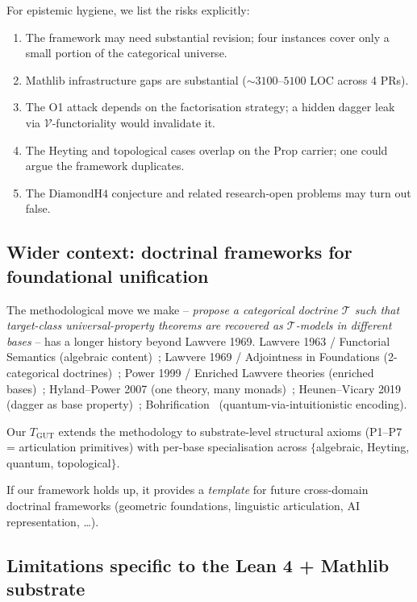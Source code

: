 \documentclass[11pt,a4paper]{article}
\theoremstyle{plain}
\theoremstyle{definition}
\theoremstyle{remark}
\newcommand{\TGUT}{T_{\mathrm{GUT}}}
\newcommand{\DiamondH}{\mathrm{DiamondH4}}
\begin{document}
For epistemic hygiene, we list the risks explicitly:
\begin{enumerate}[leftmargin=*]
\item The framework may need substantial revision; four instances cover only a small portion of the categorical universe.
\item Mathlib infrastructure gaps are substantial (${\sim}3100$--$5100$ LOC across 4 PRs).
\item The O1 attack depends on the factorisation strategy; a hidden dagger leak via $\mathcal{V}$-functoriality would invalidate it.
\item The Heyting and topological cases overlap on the $\mathrm{Prop}$ carrier; one could argue the framework duplicates.
\item The $\DiamondH$ conjecture and related research-open problems may turn out false.
\end{enumerate}

\subsection{Wider context: doctrinal frameworks for foundational unification}\label{sec:disc:wider}

The methodological move we make -- \emph{propose a categorical doctrine $\mathcal{T}$ such that target-class universal-property theorems are recovered as $\mathcal{T}$-models in different bases} -- has a longer history beyond Lawvere 1969. Lawvere 1963 / Functorial Semantics (algebraic content)~\cite{Law63}; Lawvere 1969 / Adjointness in Foundations (2-categorical doctrines)~\cite{Law69}; Power 1999 / Enriched Lawvere theories (enriched bases)~\cite{Pow99}; Hyland--Power 2007 (one theory, many monads)~\cite{HP07}; Heunen--Vicary 2019 (dagger as base property)~\cite{HV19}; Bohrification~\cite{HLS09} (quantum-via-intuitionistic encoding).

Our $\TGUT$ extends the methodology to substrate-level structural axioms (P1--P7 = articulation primitives) with per-base specialisation across $\{$algebraic, Heyting, quantum, topological$\}$.

If our framework holds up, it provides a \emph{template} for future cross-domain doctrinal frameworks (geometric foundations, linguistic articulation, AI representation, \dots).

\subsection{Limitations specific to the Lean 4 + Mathlib substrate}\label{sec:disc:lean}
\end{document}
